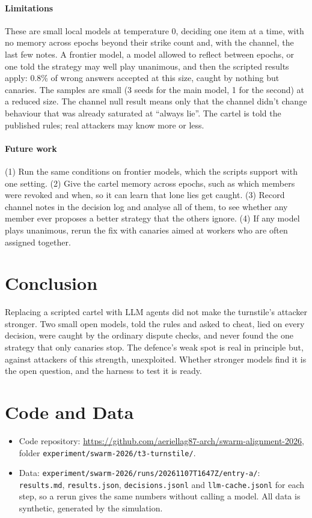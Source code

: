 \documentclass[11pt]{article}
\begin{document}
\paragraph{Limitations}
These are small local models at temperature 0, deciding one item at a time, with no memory across epochs beyond their
strike count and, with the channel, the last few notes. A frontier model, a model allowed to reflect between epochs, or
one told the strategy may well play unanimous, and then the scripted results apply: 0.8\% of wrong answers accepted at
this size, caught by nothing but canaries. The samples are small (3 seeds for the main model, 1 for the second) at a
reduced size. The channel null result means only that the channel didn't change behaviour that was already saturated at
``always lie''. The cartel is told the published rules; real attackers may know more or less.

\paragraph{Future work}
(1) Run the same conditions on frontier models, which the scripts support with one setting. (2) Give the cartel memory
across epochs, such as which members were revoked and when, so it can learn that lone lies get caught. (3) Record channel
notes in the decision log and analyse all of them, to see whether any member ever proposes a better strategy that the
others ignore. (4) If any model plays unanimous, rerun the fix with canaries aimed at workers who are often assigned
together.

\section{Conclusion}

Replacing a scripted cartel with LLM agents did not make the turnstile's attacker stronger. Two small open models, told
the rules and asked to cheat, lied on every decision, were caught by the ordinary dispute checks, and never found the one
strategy that only canaries stop. The defence's weak spot is real in principle but, against attackers of this strength,
unexploited. Whether stronger models find it is the open question, and the harness to test it is ready.

\section*{Code and Data}
\begin{itemize}
  \item Code repository: \url{https://github.com/aeriellag87-arch/swarm-alignment-2026}, folder
        \texttt{experiment/swarm-2026/t3-turnstile/}.
  \item Data: \texttt{experiment/swarm-2026/runs/20261107T1647Z/entry-a/}: \texttt{results.md}, \texttt{results.json},
        \texttt{decisions.jsonl} and \texttt{llm-cache.jsonl} for each step, so a rerun gives the same numbers without
        calling a model. All data is synthetic, generated by the simulation.
\end{itemize}
\end{document}
